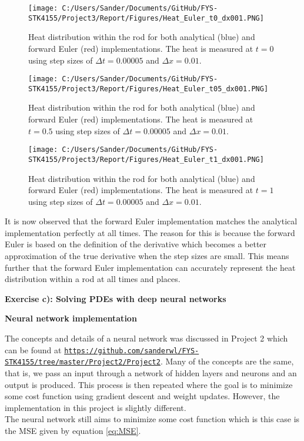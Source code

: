 \documentclass[12pt,a4paper]{article}
\begin{document}
\begin{figure}[H]
\centering
\texttt{[image: C:/Users/Sander/Documents/GitHub/FYS-STK4155/Project3/Report/Figures/Heat\_Euler\_t0\_dx001.PNG]}
\caption{\label{fig:rodHeatEulerT0DX001} Heat distribution within the rod for both analytical (blue) and forward Euler (red) implementations. The heat is measured at $t = 0$ using step sizes of $\Delta t = 0.00005$ and $\Delta x = 0.01$.}
\end{figure}

\begin{figure}[H]
\centering
\texttt{[image: C:/Users/Sander/Documents/GitHub/FYS-STK4155/Project3/Report/Figures/Heat\_Euler\_t05\_dx001.PNG]}
\caption{\label{fig:rodHeatEulerT05DX001} Heat distribution within the rod for both analytical (blue) and forward Euler (red) implementations. The heat is measured at $t = 0.5$ using step sizes of $\Delta t = 0.00005$ and $\Delta x = 0.01$.}
\end{figure}

\begin{figure}[H]
\centering
\texttt{[image: C:/Users/Sander/Documents/GitHub/FYS-STK4155/Project3/Report/Figures/Heat\_Euler\_t1\_dx001.PNG]}
\caption{\label{fig:rodHeatEulerT1DX001} Heat distribution within the rod for both analytical (blue) and forward Euler (red) implementations. The heat is measured at $t = 1$ using step sizes of $\Delta t = 0.00005$ and $\Delta x = 0.01$.}
\end{figure}

\noindent It is now observed that the forward Euler implementation matches the analytical implementation perfectly at all times. The reason for this is because the forward Euler is based on the definition of the derivative which becomes a better approximation of the true derivative when the step sizes are small. This means further that the forward Euler implementation can accurately represent the heat distribution within a rod at all times and places.

\newpage

\begin{center}
\Large{\textbf{Exercise c): Solving PDEs with deep neural networks}}
\end{center}

\begin{center}
\large{\textbf{Neural network implementation}}
\end{center}

\noindent The concepts and details of a neural network was discussed in Project 2 which can be found at \href{{https://github.com/sanderwl/FYS-STK4155/tree/master/Project2/Project2}}{\nolinkurl{https://github.com/sanderwl/FYS-STK4155/tree/master/Project2/Project2}}. Many of the concepts are the same, that is, we pass an input through a network of hidden layers and neurons and an output is produced. This process is then repeated where the goal is to minimize some cost function using gradient descent and weight updates. However, the implementation in this project is slightly different. 
\\
The neural network still aims to minimize some cost function which is this case is the MSE given by equation \ref{eq:MSE}.
\end{document}

